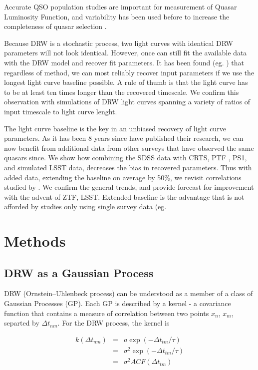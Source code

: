 \documentclass[twocolumn]{aastex62}
\begin{document}
Accurate QSO population studies are important for measurement of Quasar Luminosity Function, and variability has been used before to increase the completeness of quasar selection  \citep{ ross2013, palanque2013, alsayyad2016, mcgreer2013, mcgreer2018}. 


Because DRW is a stochastic process, two light curves with identical DRW parameters will not look identical. However, once can still fit the available data with the DRW model and recover fit parameters. It has been found (eg. \citet{macleod2011, kozlowski2010, kozlowski2017a}) that regardless of method,  we can most reliably recover input parameters if we use the longest light curve baseline possible. A rule of thumb is that the light curve has to be at least  ten  times longer than the recovered timescale.  We confirm this observation with simulations of DRW light curves spanning a variety of ratios of input timescale to light curve lenght.  

The light curve baseline is the key in an unbiased recovery of light curve parameters. As it has been  8 years since \citet{macleod2010} have published their research,   we can now benefit from additional data from other surveys that have observed the same quasars since. We show how combining the SDSS data with CRTS, PTF , PS1,  and simulated LSST data, decreases the bias in recovered parameters.  Thus with added data, extending the baseline on average by 50\%,  we revisit correlations studied by \citet{macleod2010}.  We confirm the general trends, and provide forecast for improvement with the advent of ZTF, LSST. Extended baseline is the advantage that is not afforded by studies only using single survey data (eg. \citet{hernitschek2016}



\section{Methods}
\subsection{DRW as a Gaussian Process}
DRW (Ornstein–Uhlenbeck process) can be understood as a member of a class of Gaussian Processes (GP). Each GP is described by a kernel - a covariance function that contains a measure of correlation between two points $x_{n}$, $x_{m}$, separted by $\Delta t_{nm}$. For the  DRW process, the kernel is 

\begin{eqnarray}
k(\Delta t_{nm}) &=& a \exp{(-\Delta t_{tm} / \tau)} \\
                 &=& \sigma^{2}\exp{(-\Delta t_{tm} / \tau)}  \\
                 &=& \sigma^{2} ACF(\Delta t_{tm})
\end{eqnarray} 
\end{document}
